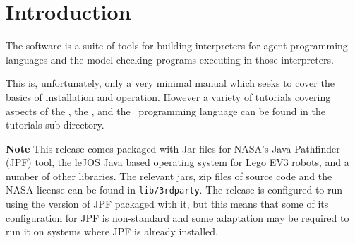 \chapter{Introduction}

The \mcapl{} software is a suite of tools for building interpreters
for agent programming languages and the model checking programs
executing in those interpreters.  

This is, unfortunately, only a very minimal manual which seeks to cover the basics of installation and operation.  However a variety of tutorials covering aspects of the \ajpf, the \ail, and the \gwendolen\ programming language can be found in the tutorials sub-directory.

{\bf Note} This release comes packaged with Jar files for NASA's Java Pathfinder (JPF) tool, the leJOS Java based operating system for Lego EV3 robots, and a number of other libraries.  The relevant jars, zip files of source code and the NASA license can be found in \texttt{lib/3rdparty}.  The release is configured to run using the version of JPF packaged with it, but this means that some of its configuration for JPF is non-standard and some adaptation may be required to run it on systems where JPF is already installed.


